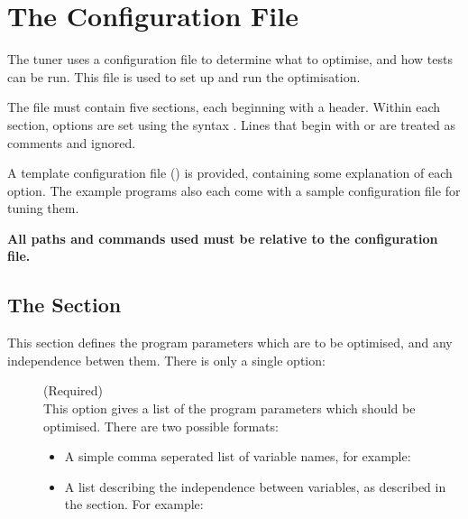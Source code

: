 \documentclass[a4paper, draft]{article}
\begin{document}
\section{The Configuration File}
\label{sec:conf-file}
The tuner uses a configuration file to determine what to optimise, and how 
tests can be run. This file is used to set up and run the optimisation.

The file must contain five sections, each beginning with a 
 header. Within each section, options are set 
using the syntax . Lines that begin with 
\confsnippet{\#} or \confsnippet{;} are treated as comments and ignored.

A template configuration file () is provided, 
containing some explanation of each option. The example programs also each come 
with a sample configuration file for tuning them.

\textbf{All paths and commands used must be relative to the configuration 
file.}

\subsection{The \confsnippet{[variables]} Section}
This section defines the program parameters which are to be optimised, and 
any independence betwen them. There is only a single option:

\begin{description}
    \item[] (Required) \\
        This option gives a list of the program parameters which should be 
        optimised. There are two possible formats:
        \begin{itemize}
            \item A simple comma seperated list of variable names, 
                for example: \\

            \item A list describing the independence between variables, 
                as described in the \emph{} section. 
                For example: \\
                 \\
        \end{itemize}
\end{description}
\end{document}
